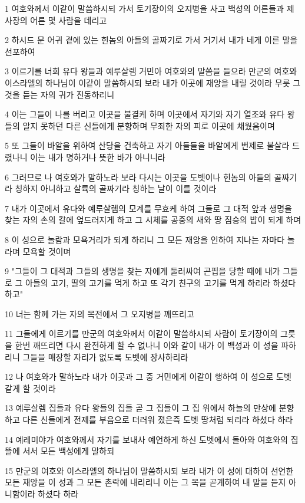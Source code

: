\par 1 여호와께서 이같이 말씀하시되 가서 토기장이의 오지병을 사고 백성의 어른들과 제사장의 어른 몇 사람을 데리고
\par 2 하시드 문 어귀 곁에 있는 힌놈의 아들의 골짜기로 가서 거기서 내가 네게 이른 말을 선포하여
\par 3 이르기를 너희 유다 왕들과 예루살렘 거민아 여호와의 말씀을 들으라 만군의 여호와 이스라엘의 하나님이 이같이 말씀하시되 보라 내가 이곳에 재앙을 내릴 것이라 무릇 그것을 듣는 자의 귀가 진동하리니
\par 4 이는 그들이 나를 버리고 이곳을 불결케 하며 이곳에서 자기와 자기 열조와 유다 왕들의 알지 못하던 다른 신들에게 분향하며 무죄한 자의 피로 이곳에 채웠음이며
\par 5 또 그들이 바알을 위하여 산당을 건축하고 자기 아들들을 바알에게 번제로 불살라 드렸나니 이는 내가 명하거나 뜻한 바가 아니니라
\par 6 그러므로 나 여호와가 말하노라 보라 다시는 이곳을 도벳이나 힌놈의 아들의 골짜기라 칭하지 아니하고 살륙의 골짜기라 칭하는 날이 이를 것이라
\par 7 내가 이곳에서 유다와 예루살렘의 모계를 무효케 하여 그들로 그 대적 앞과 생명을 찾는 자의 손의 칼에 엎드러지게 하고 그 시체를 공중의 새와 땅 짐승의 밥이 되게 하며
\par 8 이 성으로 놀람과 모욕거리가 되게 하리니 그 모든 재앙을 인하여 지나는 자마다 놀라며 모욕할 것이며
\par 9 "그들이 그 대적과 그들의 생명을 찾는 자에게 둘러싸여 곤핍을 당할 때에 내가 그들로 그 아들의 고기, 딸의 고기를 먹게 하고 또 각기 친구의 고기를 먹게 하리라 하셨다 하고"
\par 10 너는 함께 가는 자의 목전에서 그 오지병을 깨뜨리고
\par 11 그들에게 이르기를 만군의 여호와께서 이같이 말씀하시되 사람이 토기장이의 그릇을 한번 깨뜨리면 다시 완전하게 할 수 없나니 이와 같이 내가 이 백성과 이 성을 파하리니 그들을 매장할 자리가 없도록 도벳에 장사하리라
\par 12 나 여호와가 말하노라 내가 이곳과 그 중 거민에게 이같이 행하여 이 성으로 도벳 같게 할 것이라
\par 13 예루살렘 집들과 유다 왕들의 집들 곧 그 집들이 그 집 위에서 하늘의 만상에 분향하고 다른 신들에게 전제를 부음으로 더러워 졌은즉 도벳 땅처럼 되리라 하셨다 하라
\par 14 예레미야가 여호와께서 자기를 보내사 예언하게 하신 도벳에서 돌아와 여호와의 집 뜰에 서서 모든 백성에게 말하되
\par 15 만군의 여호와 이스라엘의 하나님이 말씀하시되 보라 내가 이 성에 대하여 선언한 모든 재앙을 이 성과 그 모든 촌락에 내리리니 이는 그 목을 곧게하여 내 말을 듣지 아니함이라 하셨다 하라

